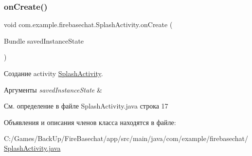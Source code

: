 \subsubsection{\texorpdfstring{on\+Create()}{onCreate()}}
{\footnotesize\ttfamily void com.\+example.\+firebasechat.\+Splash\+Activity.\+on\+Create (\begin{DoxyParamCaption}\item[{Bundle}]{saved\+Instance\+State }\end{DoxyParamCaption})\hspace{0.3cm}{\ttfamily [protected]}}



Создание activity \mbox{\hyperlink{classcom_1_1example_1_1firebasechat_1_1_splash_activity}{Splash\+Activity}}. 


\begin{DoxyParams}{Аргументы}
{\em saved\+Instance\+State} & \\
\hline
\end{DoxyParams}


См. определение в файле Splash\+Activity.\+java строка 17



Объявления и описания членов класса находятся в файле\+:\begin{DoxyCompactItemize}
\item 
C\+:/\+Games/\+Back\+Up/\+Fire\+Basechat/app/src/main/java/com/example/firebasechat/\mbox{\hyperlink{_splash_activity_8java}{Splash\+Activity.\+java}}\end{DoxyCompactItemize}
